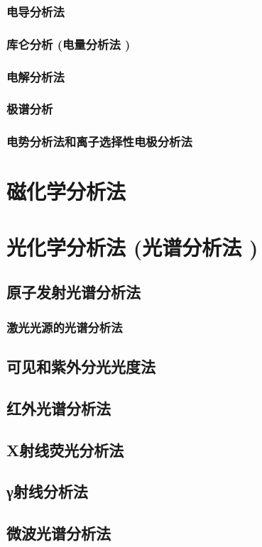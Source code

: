 \documentclass[UTF8]{../03-Chemistry}
\begin{document}
    \subsubsection{电导分析法}
    \subsubsection{库仑分析 (电量分析法 )}
    \subsubsection{电解分析法}
    \subsubsection{极谱分析}
    \subsubsection{电势分析法和离子选择性电极分析法}
\section{磁化学分析法}
\section{光化学分析法 (光谱分析法 )}
    \subsection{原子发射光谱分析法}
        \subsubsection{激光光源的光谱分析法}
    \subsection{可见和紫外分光光度法}
    \subsection{红外光谱分析法}
    \subsection{X射线荧光分析法}
    \subsection{γ射线分析法}
    \subsection{微波光谱分析法}
\end{document}
